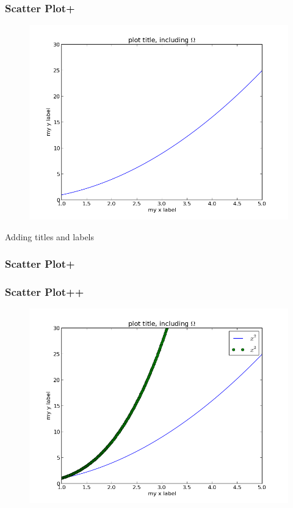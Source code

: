 \documentclass{beamer}
\begin{document}
\begin{frame}
\frametitle{Scatter Plot+}
\begin{figure}[h]
\centering
\includegraphics[width=.9\textwidth]{images/line_plot_plus.png}
\end{figure}
\end{frame}

\begin{frame}
Adding titles and labels
\frametitle{Scatter Plot+}
\end{frame}

\begin{frame}
\frametitle{Scatter Plot++}
\begin{figure}[h]
\centering
\includegraphics[width=.9\textwidth]{images/line_plot_plus2.png}
\end{figure}
\end{frame}
\end{document}
